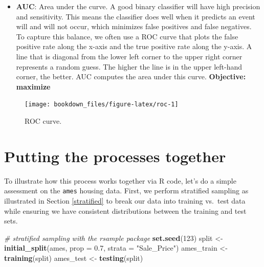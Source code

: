 \documentclass[]{krantz}
\makeatletter
\newenvironment{Shaded}{\begin{snugshade}}{\end{snugshade}}
\newcommand{\CommentTok}[1]{\textcolor[rgb]{0.37,0.37,0.37}{\textit{#1}}}
\newcommand{\DataTypeTok}[1]{\textcolor[rgb]{0.27,0.27,0.27}{#1}}
\newcommand{\DecValTok}[1]{\textcolor[rgb]{0.06,0.06,0.06}{#1}}
\newcommand{\FloatTok}[1]{\textcolor[rgb]{0.06,0.06,0.06}{#1}}
\newcommand{\KeywordTok}[1]{\textcolor[rgb]{0.27,0.27,0.27}{\textbf{#1}}}
\newcommand{\NormalTok}[1]{#1}
\newcommand{\StringTok}[1]{\textcolor[rgb]{0.5,0.5,0.5}{#1}}
\providecommand{\tightlist}{%
  \setlength{\itemsep}{0pt}\setlength{\parskip}{0pt}}
\newenvironment{kframe}{%
\medskip{}
\setlength{\fboxsep}{.8em}
 \def\at@end@of@kframe{}%
 \ifinner\ifhmode%
  \def\at@end@of@kframe{\end{minipage}}%
  \begin{minipage}{\columnwidth}%
 \fi\fi%
 \def\FrameCommand##1{\hskip\@totalleftmargin \hskip-\fboxsep
 \colorbox{shadecolor}{##1}\hskip-\fboxsep
     \hskip-\linewidth \hskip-\@totalleftmargin \hskip\columnwidth}%
 \MakeFramed {\advance\hsize-\width
   \@totalleftmargin\z@ \linewidth\hsize
   \@setminipage}}%
 {\par\unskip\endMakeFramed%
 \at@end@of@kframe}
\renewenvironment{Shaded}{\begin{kframe}}{\end{kframe}}
\makeatother
\begin{document}
\begin{itemize}
\tightlist
\item
  \textbf{AUC}: Area under the curve. A good binary classifier will have high precision and sensitivity. This means the classifier does well when it predicts an event will and will not occur, which minimizes false positives and false negatives. To capture this balance, we often use a ROC curve that plots the false positive rate along the x-axis and the true positive rate along the y-axis. A line that is diagonal from the lower left corner to the upper right corner represents a random guess. The higher the line is in the upper left-hand corner, the better. AUC computes the area under this curve. \textbf{Objective: maximize}
\end{itemize}

\begin{figure}

{\centering \texttt{[image: bookdown\_files/figure-latex/roc-1]} 

}

\caption{ROC curve.}\label{fig:roc}
\end{figure}

\hypertarget{put-process-together}{%
\section{Putting the processes together}\label{put-process-together}}

To illustrate how this process works together via R code, let's do a simple assessment on the \texttt{ames} housing data. First, we perform stratified sampling as illustrated in Section \ref{stratified} to break our data into training vs.~test data while ensuring we have consistent distributions between the training and test sets.

\begin{Shaded}
\begin{Highlighting}[]
\CommentTok{# stratified sampling with the rsample package}
\KeywordTok{set.seed}\NormalTok{(}\DecValTok{123}\NormalTok{)}
\NormalTok{split  <-}\StringTok{ }\KeywordTok{initial_split}\NormalTok{(ames, }\DataTypeTok{prop =} \FloatTok{0.7}\NormalTok{, }\DataTypeTok{strata =} \StringTok{"Sale_Price"}\NormalTok{)}
\NormalTok{ames_train  <-}\StringTok{ }\KeywordTok{training}\NormalTok{(split)}
\NormalTok{ames_test   <-}\StringTok{ }\KeywordTok{testing}\NormalTok{(split)}
\end{Highlighting}
\end{Shaded}
\end{document}
